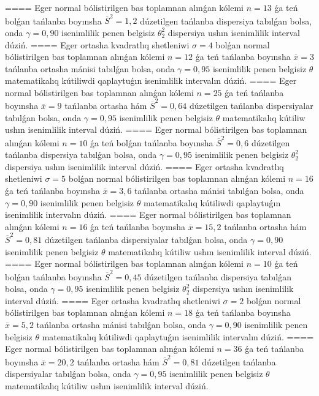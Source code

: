 ====
Eger normal bólistirilgen bas toplamnan alınǵan kólemi \(n = 13\) ǵa teń bolǵan tańlanba boyınsha \({\overline{S}}^{2} = 1,2\) dúzetilgen tańlanba dispersiya tabılǵan bolsa, onda \(\gamma = 0,90\) isenimlilik penen belgisiz \(\theta_{2}^{2}\) dispersiya ushın isenimlilik interval dúziń.
====
Eger ortasha kvadratlıq shetleniwi \(\sigma = 4\) bolǵan normal bólistirilgen bas toplamnan alınǵan kólemi \(n = 12\) ǵa teń tańlanba boyınsha \(\overline{x} = 3\) tańlanba ortasha mánisi tabılǵan bolsa, onda \(\gamma = 0,95\) isenimlilik penen belgisiz \(\theta\) matematikalıq kútiliwdi qaplaytuǵın isenimlilik intervalın dúziń.
====
Eger normal bólistirilgen bas toplamnan alınǵan kólemi \(n = 25\) ǵa teń tańlanba boyınsha \(\overline{x} = 9\) tańlanba ortasha hám \({\overline{S}}^{2} = 0,64\) dúzetilgen tańlanba dispersiyalar tabılǵan bolsa, onda \(\gamma = 0,95\) isenimlilik penen belgisiz \(\theta\) matematikalıq kútiliw ushın isenimlilik interval dúziń.
====
Eger normal bólistirilgen bas toplamnan alınǵan kólemi \(n = 10\) ǵa teń bolǵan tańlanba boyınsha \({\overline{S}}^{2} = 0,6\) dúzetilgen tańlanba dispersiya tabılǵan bolsa, onda \(\gamma = 0,95\) isenimlilik penen belgisiz \(\theta_{2}^{2}\) dispersiya ushın isenimlilik interval dúziń.
====
Eger ortasha kvadratlıq shetleniwi \(\sigma = 5\) bolǵan normal bólistirilgen bas toplamnan alınǵan kólemi \(n = 16\) ǵa teń tańlanba boyınsha \(\overline{x} = 3,6\) tańlanba ortasha mánisi tabılǵan bolsa, onda \(\gamma = 0,90\) isenimlilik penen belgisiz \(\theta\) matematikalıq kútiliwdi qaplaytuǵın isenimlilik intervalın dúziń.
====
Eger normal bólistirilgen bas toplamnan alınǵan kólemi \(n = 16\) ǵa teń tańlanba boyınsha \(\overline{x} = 15,2\) tańlanba ortasha hám \({\overline{S}}^{2} = 0,81\) dúzetilgen tańlanba dispersiyalar tabılǵan bolsa, onda \(\gamma = 0,90\) isenimlilik penen belgisiz \(\theta\) matematikalıq kútiliw ushın isenimlilik interval dúziń.
====
Eger normal bólistirilgen bas toplamnan alınǵan kólemi \(n = 10\) ǵa teń bolǵan tańlanba boyınsha \({\overline{S}}^{2} = 0,45\) dúzetilgen tańlanba dispersiya tabılǵan bolsa, onda \(\gamma = 0,95\) isenimlilik penen belgisiz \(\theta_{2}^{2}\) dispersiya ushın isenimlilik interval dúziń.
====
Eger ortasha kvadratlıq shetleniwi \(\sigma = 2\) bolǵan normal bólistirilgen bas toplamnan alınǵan kólemi \(n = 18\) ǵa teń tańlanba boyınsha \(\overline{x} = 5,2\) tańlanba ortasha mánisi tabılǵan bolsa, onda \(\gamma = 0,90\) isenimlilik penen belgisiz \(\theta\) matematikalıq kútiliwdi qaplaytuǵın isenimlilik intervalın dúziń.
====
Eger normal bólistirilgen bas toplamnan alınǵan kólemi \(n = 36\) ǵa teń tańlanba boyınsha \(\overline{x} = 20,2\) tańlanba ortasha hám \({\overline{S}}^{2} = 0,81\) dúzetilgen tańlanba dispersiyalar tabılǵan bolsa, onda \(\gamma = 0,95\) isenimlilik penen belgisiz \(\theta\) matematikalıq kútiliw ushın isenimlilik interval dúziń.
